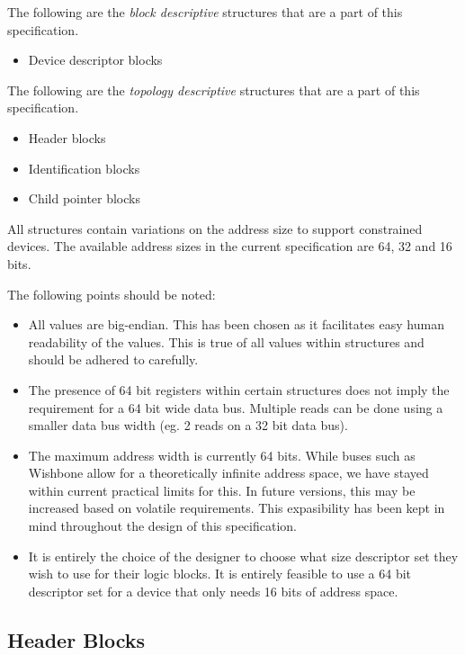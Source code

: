 \documentclass[a4paper, 12pt]{article}
\begin{document}
The following are the \emph{block descriptive} structures that are a part of this
specification.

\begin{itemize}
\item Device descriptor blocks
\end{itemize}

The following are the \emph{topology descriptive} structures that are a part of this
specification.

\begin{itemize}
\item Header blocks
\item Identification blocks
\item Child pointer blocks
\end{itemize}

All structures contain variations on the address size to support constrained
devices. The available address sizes in the current specification are 64, 32
and 16 bits.

The following points should be noted:

\begin{itemize}
\item All values are big-endian. This has been chosen as it facilitates easy
human readability of the values. This is true of all values within structures
and should be adhered to carefully.
\item The presence of 64 bit registers within certain structures does not imply
the requirement for a 64 bit wide data bus. Multiple reads can be done using a
smaller data bus width (eg. 2 reads on a 32 bit data bus).
\item The maximum address width is currently 64 bits. While buses such as Wishbone
allow for a theoretically infinite address space, we have stayed within current
practical limits for this. In future versions, this may be increased based on
volatile requirements. This expasibility has been kept in mind throughout the
design of this specification.
\item It is entirely the choice of the designer to choose what size descriptor set
they wish to use for their logic blocks. It is entirely feasible to use a 64 bit
descriptor set for a device that only needs 16 bits of address space.
\end{itemize}

\subsection{Header Blocks}
\end{document}

